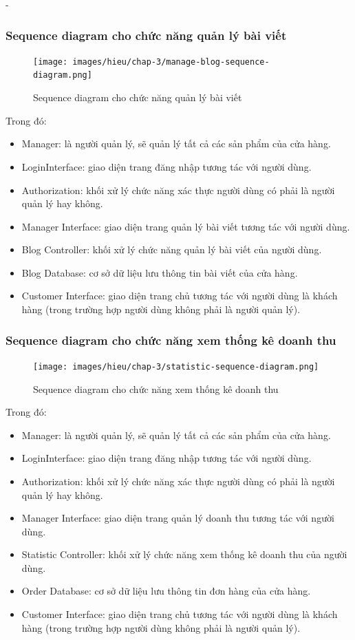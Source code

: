 \begin {list} {-}{}
\subsubsection{Sequence diagram cho chức năng quản lý bài viết}
\begin{figure}[H]
    \centering
    \texttt{[image: images/hieu/chap-3/manage-blog-sequence-diagram.png]}
    \caption{Sequence diagram cho chức năng quản lý bài viết}
\end{figure}
\noindent Trong đó:
\begin{itemize}
    \item Manager: là người quản lý, sẽ quản lý tất cả các sản phẩm của cửa hàng.
    \item LoginInterface: giao diện trang đăng nhập tương tác với người dùng.
    \item Authorization: khối xử lý chức năng xác thực người dùng có phải là người quản lý hay không.
    \item Manager Interface: giao diện trang quản lý bài viết tương tác với người dùng.
    \item Blog Controller: khối xử lý chức năng quản lý bài viết của người dùng.
    \item Blog Database: cơ sở dữ liệu lưu thông tin bài viết của cửa hàng.
    \item Customer Interface: giao diện trang chủ tương tác với người dùng là khách hàng (trong trường hợp người dùng không phải là người quản lý).
\end{itemize}
\newpage
\subsubsection{Sequence diagram cho chức năng xem thống kê doanh thu}
\begin{figure}[H]
    \centering
    \texttt{[image: images/hieu/chap-3/statistic-sequence-diagram.png]}
    \caption{Sequence diagram cho chức năng xem thống kê doanh thu}
\end{figure}
\noindent Trong đó:
\begin{itemize}
    \item Manager: là người quản lý, sẽ quản lý tất cả các sản phẩm của cửa hàng.
    \item LoginInterface: giao diện trang đăng nhập tương tác với người dùng.
    \item Authorization: khối xử lý chức năng xác thực người dùng có phải là người quản lý hay không.
    \item Manager Interface: giao diện trang quản lý doanh thu tương tác với người dùng.
    \item Statistic Controller: khối xử lý chức năng xem thống kê doanh thu của người dùng.
    \item Order Database: cơ sở dữ liệu lưu thông tin đơn hàng của cửa hàng.
    \item Customer Interface: giao diện trang chủ tương tác với người dùng là khách hàng (trong trường hợp người dùng không phải là người quản lý).
\end{itemize}
\newpage

\end{list}
